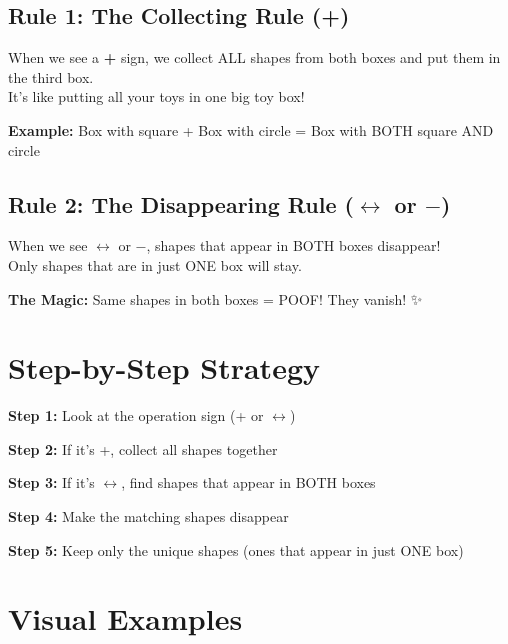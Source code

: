 \documentclass[a4paper,11pt]{article}
\begin{document}
\subsection{Rule 1: The Collecting Rule (+)}

\begin{tcolorbox}[colback=orange!5!white,colframe=orange!75!black,title=\textbf{Collecting Rule}]
When we see a \textbf{+} sign, we collect ALL shapes from both boxes and put them in the third box.
\\
It's like putting all your toys in one big toy box!
\end{tcolorbox}

\textbf{Example:} Box with square + Box with circle = Box with BOTH square AND circle

\subsection{Rule 2: The Disappearing Rule ($\leftrightarrow$ or $-$)}

\begin{tcolorbox}[colback=red!5!white,colframe=red!75!black,title=\textbf{Disappearing Rule (Magic Trick!)}]
When we see $\leftrightarrow$ or $-$, shapes that appear in BOTH boxes disappear!
\\
Only shapes that are in just ONE box will stay.
\end{tcolorbox}

\textbf{The Magic:} Same shapes in both boxes = POOF! They vanish! ✨

\section{Step-by-Step Strategy}

\begin{tcolorbox}[colback=purple!5!white,colframe=purple!75!black,title=\textbf{How to Solve Any Shape Puzzle}]
\textbf{Step 1:} Look at the operation sign (+ or $\leftrightarrow$)

\textbf{Step 2:} If it's +, collect all shapes together

\textbf{Step 3:} If it's $\leftrightarrow$, find shapes that appear in BOTH boxes

\textbf{Step 4:} Make the matching shapes disappear

\textbf{Step 5:} Keep only the unique shapes (ones that appear in just ONE box)
\end{tcolorbox}

\section{Visual Examples}
\end{document}
